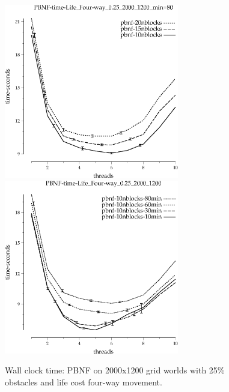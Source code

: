 \documentclass{article}
\begin{document}
\begin{appendices}
\begin{figure}[h]
\begin{center}
\includegraphics[width=3in]{../graphs/grid_life_four-way_0.25_2000_1200/PBNF-time-Life_Four-way_0.25_2000_1200_min=80.eps}
\includegraphics[width=3in]{../graphs/grid_life_four-way_0.25_2000_1200/PBNF-time-Life_Four-way_0.25_2000_1200.eps}
\caption{Wall clock time: PBNF on 2000x1200 grid worlds with 25\%
  obstacles and life cost four-way movement.}
\end{center}
\end{figure}


\end{appendices}
\end{document}
